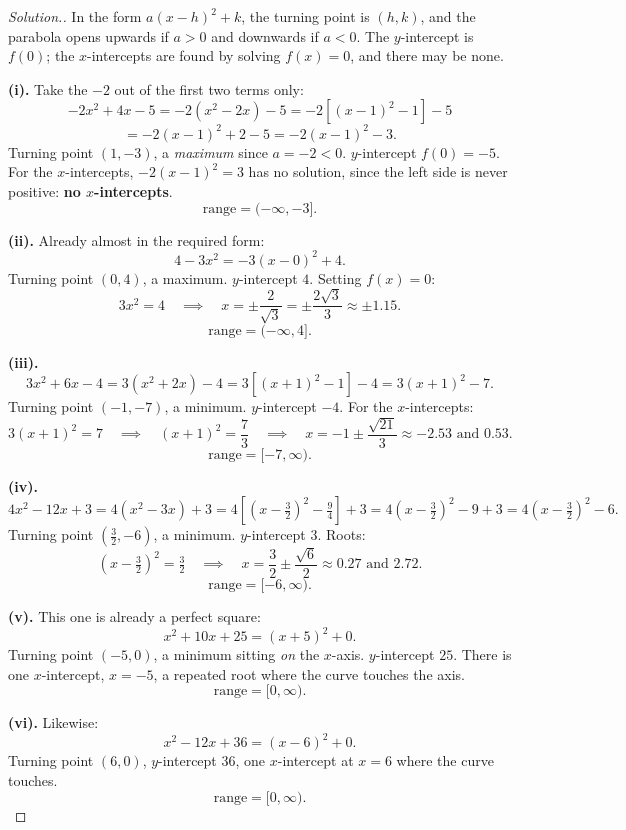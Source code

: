 \documentclass[11pt,a4paper]{article}
\theoremstyle{definition}
\newenvironment{solution}
  {\renewcommand{\qedsymbol}{}\begin{proof}[\textit{Solution}.]}
  {\end{proof}}
\begin{document}
\begin{solution}
In the form $a(x-h)^2+k$, the turning point is $(h,k)$, and the parabola opens upwards
if $a>0$ and downwards if $a<0$. The $y$-intercept is $f(0)$; the $x$-intercepts are
found by solving $f(x)=0$, and there may be none.

\textbf{(i).} Take the $-2$ out of the first two terms only:
$$-2x^2+4x-5=-2\left(x^2-2x\right)-5=-2\left[(x-1)^2-1\right]-5$$
$$=-2(x-1)^2+2-5=-2(x-1)^2-3.$$
Turning point $(1,-3)$, a \emph{maximum} since $a=-2<0$. $y$-intercept $f(0)=-5$.
For the $x$-intercepts, $-2(x-1)^2=3$ has no solution, since the left side is never
positive: \textbf{no $x$-intercepts}.
$$\text{range}=(-\infty,-3].$$

\textbf{(ii).} Already almost in the required form:
$$4-3x^2=-3(x-0)^2+4.$$
Turning point $(0,4)$, a maximum. $y$-intercept $4$. Setting $f(x)=0$:
$$3x^2=4\quad\implies\quad x=\pm\frac{2}{\sqrt{3}}=\pm\frac{2\sqrt{3}}{3}\approx\pm 1.15.$$
$$\text{range}=(-\infty,4].$$

\textbf{(iii).}
$$3x^2+6x-4=3\left(x^2+2x\right)-4=3\left[(x+1)^2-1\right]-4=3(x+1)^2-7.$$
Turning point $(-1,-7)$, a minimum. $y$-intercept $-4$. For the $x$-intercepts:
$$3(x+1)^2=7\quad\implies\quad (x+1)^2=\frac{7}{3}\quad\implies\quad
x=-1\pm\frac{\sqrt{21}}{3}\approx -2.53 \text{ and } 0.53.$$
$$\text{range}=[-7,\infty).$$

\textbf{(iv).}
$$4x^2-12x+3=4\left(x^2-3x\right)+3=4\left[\left(x-\tfrac{3}{2}\right)^2
-\tfrac{9}{4}\right]+3=4\left(x-\tfrac{3}{2}\right)^2-9+3
=4\left(x-\tfrac{3}{2}\right)^2-6.$$
Turning point $\left(\frac{3}{2},-6\right)$, a minimum. $y$-intercept $3$. Roots:
$$\left(x-\tfrac{3}{2}\right)^2=\tfrac{3}{2}\quad\implies\quad
x=\frac{3}{2}\pm\frac{\sqrt{6}}{2}\approx 0.27 \text{ and } 2.72.$$
$$\text{range}=[-6,\infty).$$

\textbf{(v).} This one is already a perfect square:
$$x^2+10x+25=(x+5)^2+0.$$
Turning point $(-5,0)$, a minimum sitting \emph{on} the $x$-axis. $y$-intercept $25$.
There is one $x$-intercept, $x=-5$, a repeated root where the curve touches the axis.
$$\text{range}=[0,\infty).$$

\textbf{(vi).} Likewise:
$$x^2-12x+36=(x-6)^2+0.$$
Turning point $(6,0)$, $y$-intercept $36$, one $x$-intercept at $x=6$ where the curve
touches.
$$\text{range}=[0,\infty).$$


\end{solution}
\end{document}

